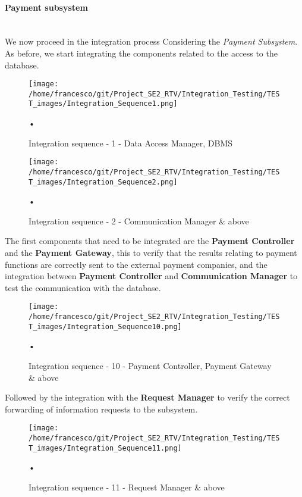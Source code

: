 \documentclass[10pt, a4paper,titlepage]{article}
\begin{document}
\paragraph{Payment subsystem}\mbox{}\\
We now proceed in the integration process Considering the \emph{Payment Subsystem}.
As before, we start integrating the components related to the access to the database.
\begin{figure}[h]
\begin{center}
\texttt{[image: /home/francesco/git/Project\_SE2\_RTV/Integration\_Testing/TEST\_images/Integration\_Sequence1.png]}
\caption{Integration sequence - 1 - Data Access Manager, DBMS}
\label{fig:int_seq1_2}
\end{center}•
\end{figure}
\begin{figure}[h]
\begin{center}
\texttt{[image: /home/francesco/git/Project\_SE2\_RTV/Integration\_Testing/TEST\_images/Integration\_Sequence2.png]}
\caption{Integration sequence - 2 - Communication Manager \& above}
\label{fig:int_seq2_2}
\end{center}•
\end{figure}
\pagebreak
The first components that need to be integrated are the \textbf{Payment Controller} and the \textbf{Payment Gateway}, this to verify that the results relating to payment functions are correctly sent to the external payment companies, and the integration between \textbf{Payment Controller} and \textbf{Communication Manager} to test the communication with the database.
\begin{figure}[h]
\begin{center}
\texttt{[image: /home/francesco/git/Project\_SE2\_RTV/Integration\_Testing/TEST\_images/Integration\_Sequence10.png]}
\caption{Integration sequence - 10 - Payment Controller, Payment Gateway \& above}
\label{fig:int_seq10}
\end{center}•
\end{figure}
\linebreak
Followed by the integration with the \textbf{Request Manager} to verify the correct forwarding of information requests to the subsystem.
\begin{figure}[h]
\begin{center}
\texttt{[image: /home/francesco/git/Project\_SE2\_RTV/Integration\_Testing/TEST\_images/Integration\_Sequence11.png]}
\caption{Integration sequence - 11 - Request Manager \& above}
\label{fig:int_seq11}
\end{center}•
\end{figure}
\end{document}
